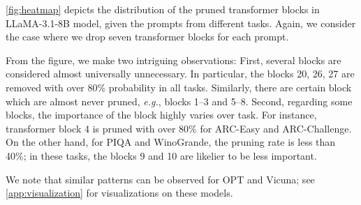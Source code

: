 \cref{fig:heatmap} depicts the distribution of the pruned transformer blocks in LLaMA-3.1-8B model, given the prompts from different tasks. Again, we consider the case where we drop seven transformer blocks for each prompt.

From the figure, we make two intriguing observations: First, several blocks are considered almost universally unnecessary. In particular, the blocks 20, 26, 27 are removed with over 80\% probability in all tasks. Similarly, there are certain block which are almost never pruned, \textit{e.g.}, blocks 1--3 and 5--8. Second, regarding some blocks, the importance of the block highly varies over task. For instance, transformer block 4 is pruned with over 80\% for ARC-Easy and ARC-Challenge. On the other hand, for PIQA and WinoGrande, the pruning rate is less than 40\%; in these tasks, the blocks 9 and 10 are likelier to be less important.

We note that similar patterns can be observed for OPT and Vicuna; see \cref{app:visualization} for visualizations on these models.

